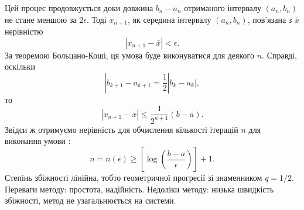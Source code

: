 	Цей процес продовжується доки довжина $b_n-a_n$ отриманого інтервалу $(a_n,b_n)$ не стане меншою за $2\epsilon$. Тоді $x_{n+1}$, як середина інтервалу $(a_n,b_n)$, пов'язана з $\bar x$ нерівністю \begin{equation} \label{eq:xn-xbar} |x_{n+1}-\bar x|<\epsilon. \end{equation} За теоремою Больцано-Коші, ця умова буде виконуватися для деякого $n$. Справді, оскільки \[|b_{k+1}-a_{k+1}=\dfrac12|b_k-a_k|,\] то \begin{equation} \label{eq:xn-xbar 2} |x_{n+1}-\bar x|\le \dfrac1{2^{n+1}}(b-a).\end{equation} Звідси ж отримуємо нерівність для обчислення кількості ітерацій $n$ для виконання умови : \[n=n(\epsilon)\ge \left[\log\left(\dfrac{b-a}{\epsilon}\right)\right] + 1.\] Степінь збіжності лінійна, тобто геометричної прогресії зі знаменником $q=1/2$.\\
	
	Переваги методу: простота, надійність. Недоліки методу: низька швидкість збіжності, метод не узагальнюється на системи.
	
